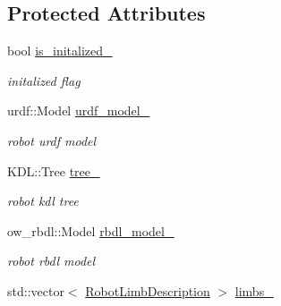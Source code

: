 \subsection*{Protected Attributes}
\begin{DoxyCompactItemize}
\item 
bool \hyperlink{classow__ik_1_1RobotModel_a917156d5f8281bbb1697b317c5b02720}{is\+\_\+initalized\+\_\+}\hypertarget{classow__ik_1_1RobotModel_a917156d5f8281bbb1697b317c5b02720}{}\label{classow__ik_1_1RobotModel_a917156d5f8281bbb1697b317c5b02720}

\begin{DoxyCompactList}\small\item\em initalized flag \end{DoxyCompactList}\item 
urdf\+::\+Model \hyperlink{classow__ik_1_1RobotModel_a312a7f106690926319dbdceecb0b60c9}{urdf\+\_\+model\+\_\+}\hypertarget{classow__ik_1_1RobotModel_a312a7f106690926319dbdceecb0b60c9}{}\label{classow__ik_1_1RobotModel_a312a7f106690926319dbdceecb0b60c9}

\begin{DoxyCompactList}\small\item\em robot urdf model \end{DoxyCompactList}\item 
K\+D\+L\+::\+Tree \hyperlink{classow__ik_1_1RobotModel_a1255698827abb15fbf25fef2ac896b16}{tree\+\_\+}\hypertarget{classow__ik_1_1RobotModel_a1255698827abb15fbf25fef2ac896b16}{}\label{classow__ik_1_1RobotModel_a1255698827abb15fbf25fef2ac896b16}

\begin{DoxyCompactList}\small\item\em robot kdl tree \end{DoxyCompactList}\item 
ow\+\_\+rbdl\+::\+Model \hyperlink{classow__ik_1_1RobotModel_ab47ea617a210df1cccfbc9f28c3511dd}{rbdl\+\_\+model\+\_\+}\hypertarget{classow__ik_1_1RobotModel_ab47ea617a210df1cccfbc9f28c3511dd}{}\label{classow__ik_1_1RobotModel_ab47ea617a210df1cccfbc9f28c3511dd}

\begin{DoxyCompactList}\small\item\em robot rbdl model \end{DoxyCompactList}\item 
std\+::vector$<$ \hyperlink{structow__ik_1_1RobotModel_1_1RobotLimbDescription}{Robot\+Limb\+Description} $>$ \hyperlink{classow__ik_1_1RobotModel_aea9b87b5b8c1e17c926764869f46b7b4}{limbs\+\_\+}\hypertarget{classow__ik_1_1RobotModel_aea9b87b5b8c1e17c926764869f46b7b4}{}\label{classow__ik_1_1RobotModel_aea9b87b5b8c1e17c926764869f46b7b4}


\end{DoxyCompactItemize}

